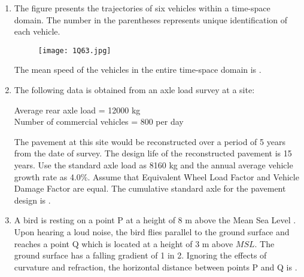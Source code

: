 \documentclass[journal,12pt,onecolumn]{article}
\theoremstyle{remark}
\begin{document}
\begin{enumerate}
    \hfill{}
    
    \item The figure  presents the trajectories of six vehicles within a time-space domain. The number in the parentheses represents unique identification of each vehicle.
    \begin{figure}[H]
        \centering
        \texttt{[image: 1Q63.jpg]}
        \caption{}
        \label{fig:q63}
    \end{figure}
    The mean speed  of the vehicles in the entire time-space domain is \underline{\hspace{2cm}} .
    
    \hfill{}
    
    \item The following data is obtained from an axle load survey at a site:
    
    Average rear axle load = 12000 kg\\
    Number of commercial vehicles = 800 per day
    
    The pavement at this site would be reconstructed over a period of 5 years from the date of survey. The design life of the reconstructed pavement is 15 years. Use the standard axle load as 8160 kg and the annual average vehicle growth rate as 4.0\%. Assume that Equivalent Wheel Load Factor  and Vehicle Damage Factor  are equal.
    The cumulative standard axle  for the pavement design is \underline{\hspace{2cm}} .
    
    \hfill{}
    
    \item A bird is resting on a point P at a height of 8 m above the Mean Sea Level . Upon hearing a loud noise, the bird flies parallel to the ground surface and reaches a point Q which is located at a height of 3 m above $MSL$. The ground surface has a falling gradient of 1 in 2. Ignoring the effects of curvature and refraction, the horizontal distance  between points P and Q is \underline{\hspace{2cm}} .
    
    \hfill{}

\end{enumerate}
\end{document}

